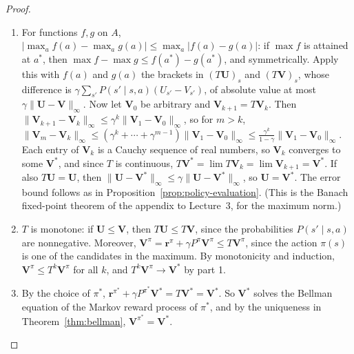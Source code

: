 \documentclass[11pt]{article}
\newcommand{\norm}[1]{\lVert #1 \rVert}
\theoremstyle{definition}
\theoremstyle{plain}
\theoremstyle{remark}
\begin{document}
\begin{proof}
    \begin{enumerate}
        \item For functions $f, g$ on $A$, $|\max_a f(a) - \max_a g(a)| \leq \max_a |f(a) - g(a)|$: if $\max f$ is attained at $a^*$, then $\max f - \max g \leq f(a^*) - g(a^*)$, and symmetrically. Apply this with $f(a)$ and $g(a)$ the brackets in $(T\mathbf{U})_s$ and $(T\mathbf{V})_s$, whose difference is $\gamma\sum_{s'}P(s' \mid s, a)(U_{s'} - V_{s'})$, of absolute value at most $\gamma\norm{\mathbf{U} - \mathbf{V}}_\infty$. Now let $\mathbf{V}_0$ be arbitrary and $\mathbf{V}_{k+1} = T\mathbf{V}_k$. Then $\norm{\mathbf{V}_{k+1} - \mathbf{V}_k}_\infty \leq \gamma^k\norm{\mathbf{V}_1 - \mathbf{V}_0}_\infty$, so for $m > k$, $\norm{\mathbf{V}_m - \mathbf{V}_k}_\infty \leq (\gamma^k + \cdots + \gamma^{m-1})\norm{\mathbf{V}_1 - \mathbf{V}_0}_\infty \leq \frac{\gamma^k}{1 - \gamma}\norm{\mathbf{V}_1 - \mathbf{V}_0}_\infty$. Each entry of $\mathbf{V}_k$ is a Cauchy sequence of real numbers, so $\mathbf{V}_k$ converges to some $\mathbf{V}^*$, and since $T$ is continuous, $T\mathbf{V}^* = \lim T\mathbf{V}_k = \lim\mathbf{V}_{k+1} = \mathbf{V}^*$. If also $T\mathbf{U} = \mathbf{U}$, then $\norm{\mathbf{U} - \mathbf{V}^*}_\infty \leq \gamma\norm{\mathbf{U} - \mathbf{V}^*}_\infty$, so $\mathbf{U} = \mathbf{V}^*$. The error bound follows as in Proposition~\ref{prop:policy-evaluation}. (This is the Banach fixed-point theorem of the appendix to Lecture~3, for the maximum norm.)
        \item $T$ is monotone: if $\mathbf{U} \leq \mathbf{V}$, then $T\mathbf{U} \leq T\mathbf{V}$, since the probabilities $P(s' \mid s, a)$ are nonnegative. Moreover, $\mathbf{V}^\pi = \mathbf{r}^\pi + \gamma P^\pi\mathbf{V}^\pi \leq T\mathbf{V}^\pi$, since the action $\pi(s)$ is one of the candidates in the maximum. By monotonicity and induction, $\mathbf{V}^\pi \leq T^k\mathbf{V}^\pi$ for all $k$, and $T^k\mathbf{V}^\pi \to \mathbf{V}^*$ by part 1.
        \item By the choice of $\pi^*$, $\mathbf{r}^{\pi^*} + \gamma P^{\pi^*}\mathbf{V}^* = T\mathbf{V}^* = \mathbf{V}^*$. So $\mathbf{V}^*$ solves the Bellman equation of the Markov reward process of $\pi^*$, and by the uniqueness in Theorem~\ref{thm:bellman}, $\mathbf{V}^{\pi^*} = \mathbf{V}^*$. \qedhere
    \end{enumerate}
\end{proof}
\end{document}
